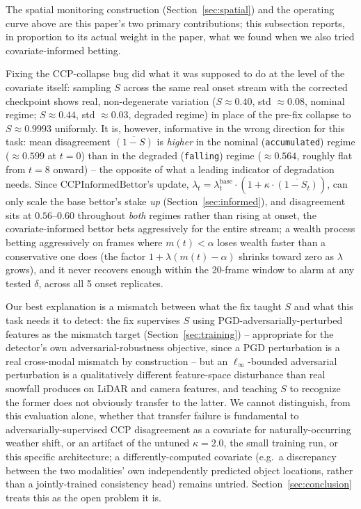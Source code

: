 The spatial monitoring construction (Section~\ref{sec:spatial}) and the operating curve above are this paper's two primary contributions; this subsection reports, in proportion to its actual weight in the paper, what we found when we also tried covariate-informed betting.

Fixing the CCP-collapse bug did what it was supposed to do at the level of the covariate itself: sampling $S$ across the same real onset stream with the corrected checkpoint shows real, non-degenerate variation ($S \approx 0.40$, std $\approx 0.08$, nominal regime; $S \approx 0.44$, std $\approx 0.03$, degraded regime) in place of the pre-fix collapse to $S \approx 0.9993$ uniformly. It is, however, informative in the wrong direction for this task: mean disagreement $\overline{(1-S)}$ is \emph{higher} in the nominal (\texttt{accumulated}) regime ($\approx 0.599$ at $t=0$) than in the degraded (\texttt{falling}) regime ($\approx 0.564$, roughly flat from $t=8$ onward) -- the opposite of what a leading indicator of degradation needs. Since $\text{CCPInformedBettor}$'s update, $\lambda_t = \lambda_t^{\text{base}} \cdot (1 + \kappa \cdot \overline{(1-S_t)})$, can only scale the base bettor's stake \emph{up} (Section~\ref{sec:informed}), and disagreement sits at $0.56$--$0.60$ throughout \emph{both} regimes rather than rising at onset, the covariate-informed bettor bets aggressively for the entire stream; a wealth process betting aggressively on frames where $m(t) < \alpha$ loses wealth faster than a conservative one does (the factor $1 + \lambda(m(t)-\alpha)$ shrinks toward zero as $\lambda$ grows), and it never recovers enough within the 20-frame window to alarm at any tested $\delta$, across all 5 onset replicates.

Our best explanation is a mismatch between what the fix taught $S$ and what this task needs it to detect: the fix supervises $S$ using PGD-adversarially-perturbed features as the mismatch target (Section~\ref{sec:training}) -- appropriate for the detector's own adversarial-robustness objective, since a PGD perturbation is a real cross-modal mismatch by construction -- but an $\ell_\infty$-bounded adversarial perturbation is a qualitatively different feature-space disturbance than real snowfall produces on LiDAR and camera features, and teaching $S$ to recognize the former does not obviously transfer to the latter. We cannot distinguish, from this evaluation alone, whether that transfer failure is fundamental to adversarially-supervised CCP disagreement as a covariate for naturally-occurring weather shift, or an artifact of the untuned $\kappa=2.0$, the small training run, or this specific architecture; a differently-computed covariate (e.g.\ a discrepancy between the two modalities' own independently predicted object locations, rather than a jointly-trained consistency head) remains untried. Section~\ref{sec:conclusion} treats this as the open problem it is.
